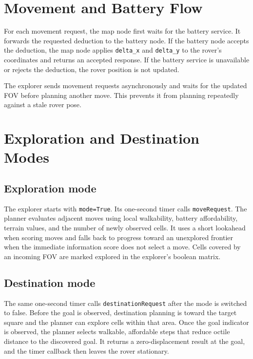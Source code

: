 \documentclass[11pt,a4paper]{article}
\begin{document}
\section{Movement and Battery Flow}

For each movement request, the map node first waits for the battery service.
It forwards the requested deduction to the battery node. If the battery node
accepts the deduction, the map node applies \texttt{delta\_x} and
\texttt{delta\_y} to the rover's coordinates and returns an accepted response.
If the battery service is unavailable or rejects the deduction, the rover
position is not updated.

The explorer sends movement requests asynchronously and waits for the updated
FOV before planning another move. This prevents it from planning repeatedly
against a stale rover pose.

\section{Exploration and Destination Modes}

\subsection{Exploration mode}

The explorer starts with \texttt{mode=True}. Its one-second timer calls
\texttt{moveRequest}. The planner evaluates adjacent moves using local
walkability, battery affordability, terrain values, and the number of newly
observed cells. It uses a short lookahead when scoring moves and falls back to
progress toward an unexplored frontier when the immediate information score
does not select a move. Cells covered by an incoming FOV are marked explored
in the explorer's boolean matrix.

\subsection{Destination mode}

The same one-second timer calls \texttt{destinationRequest} after the mode is
switched to false. Before the goal is observed, destination planning is toward
the target square and the planner can explore cells within that area. Once
the goal indicator is observed, the planner selects walkable, affordable
steps that reduce octile distance to the discovered goal. It returns a
zero-displacement result at the goal, and the timer callback then leaves the
rover stationary.
\end{document}
